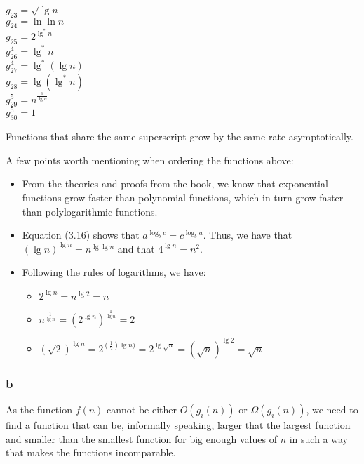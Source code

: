 \documentclass[8pt,a4paper]{article}
\begin{document}
\begin{multicols}{3}
  $g_{23}     = \sqrt{\lg n}$                 \\
  $g_{24}     = \ln \ln n$                    \\
  $g_{25}     = 2^{\lg^{*} n}$                \\
  $g^{4}_{26} = \lg^{*} n$                    \\
  $g^{4}_{27} = \lg^{*}(\lg n)$               \\
  $g_{28}     = \lg(\lg^{*} n)$               \\
  $g^{5}_{29} = n^{\frac{1}{\lg n}}$          \\
  $g^{5}_{30} = 1$                            \\
\end{multicols}

  Functions that share the same superscript grow by the same rate asymptotically.

  A few points worth mentioning when ordering the functions above:

\begin{itemize}
  \item From the theories and proofs from the book, we know that exponential functions
    grow faster than polynomial functions, which in turn grow faster than polylogarithmic
    functions.

  \item Equation (3.16) shows that $a^{\log_{b} c} = c^{\log_{b} a}$. Thus, we have that
    $(\lg n)^{\lg n} = n^{\lg \lg n}$ and that $4^{\lg n} = n^{2}$.

  \item Following the rules of logarithms, we have:

    \begin{itemize}
      \item $2^{\lg n} = n^{\lg 2} = n$
      \item $n^{\frac{1}{\lg n}} = (2^{\lg n})^{\frac{1}{\lg n}} = 2$
      \item $(\sqrt{2})^{\lg n} = 2^{(\frac{1}{2}) \lg n)} = 2^{\lg \sqrt{n}} = (\sqrt{n})^{\lg 2} = \sqrt{n}$
    \end{itemize}
\end{itemize}

\subsubsection*{b}

  As the function $f(n)$ cannot be either $O(g_{i}(n))$ or $\Omega(g_{i}(n))$, we need to find
a function that can be, informally speaking, larger that the largest function and smaller than
the smallest function for big enough values of $n$ in such a way that makes the functions
incomparable.
\end{document}
